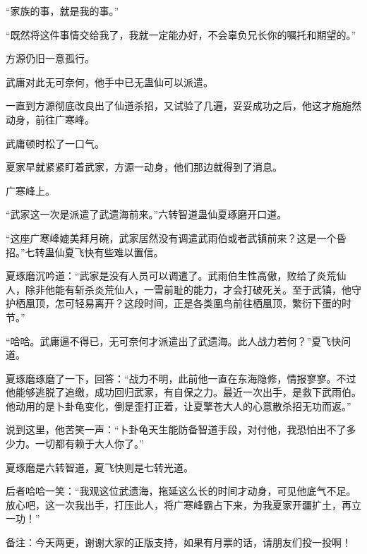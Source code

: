 \begin{this_body}
“家族的事，就是我的事。”

“既然将这件事情交给我了，我就一定能办好，不会辜负兄长你的嘱托和期望的。”

方源仍旧一意孤行。

武庸对此无可奈何，他手中已无蛊仙可以派遣。

一直到方源彻底改良出了仙道杀招，又试验了几遍，妥妥成功之后，他这才施施然动身，前往广寒峰。

武庸顿时松了一口气。

夏家早就紧紧盯着武家，方源一动身，他们那边就得到了消息。

广寒峰上。

“武家这一次是派遣了武遗海前来。”六转智道蛊仙夏琢磨开口道。

“这座广寒峰媲美拜月碗，武家居然没有调遣武雨伯或者武镇前来？这是一个昏招。”七转蛊仙夏飞快有些难以置信。

夏琢磨沉吟道：“武家是没有人员可以调遣了。武雨伯生性高傲，败给了炎荒仙人，除非他能有斩杀炎荒仙人，一雪前耻的能力，才会打破死关。至于武镇，他守护栖凰顶，怎可轻易离开？这段时间，正是各类凰鸟前往栖凰顶，繁衍下蛋的时节。”

“哈哈。武庸逼不得已，无可奈何才派遣出了武遗海。此人战力若何？”夏飞快问道。

夏琢磨琢磨了一下，回答：“战力不明，此前他一直在东海隐修，情报寥寥。不过他能够逃脱了追缴，成功回归武家，有自保之力。最近一次出手，是救下武雨伯。他动用的是卜卦龟变化，倒是歪打正着，让夏擎苍大人的心意散杀招无功而返。”

说到这里，他苦笑一声：“卜卦龟天生能防备智道手段，对付他，我恐怕出不了多少力。一切都有赖于大人你了。”

夏琢磨是六转智道，夏飞快则是七转光道。

后者哈哈一笑：“我观这位武遗海，拖延这么长的时间才动身，可见他底气不足。放心吧，这一次我出手，打压此人，将广寒峰霸占下来，为我夏家开疆扩土，再立一功！”

备注：今天两更，谢谢大家的正版支持，如果有月票的话，请朋友们投一投啊！

\end{this_body}

